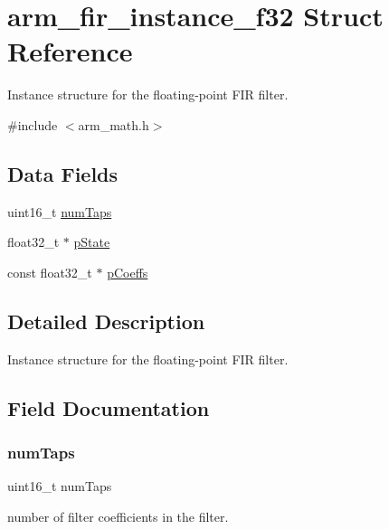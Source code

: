 \hypertarget{structarm__fir__instance__f32}{}\section{arm\+\_\+fir\+\_\+instance\+\_\+f32 Struct Reference}
\label{structarm__fir__instance__f32}


Instance structure for the floating-\/point F\+IR filter.  




{\ttfamily \#include $<$arm\+\_\+math.\+h$>$}

\subsection*{Data Fields}
\begin{DoxyCompactItemize}
\item 
uint16\+\_\+t \mbox{\hyperlink{structarm__fir__instance__f32_a751941891e47f522a7f5375fe8990aac}{num\+Taps}}
\item 
float32\+\_\+t $\ast$ \mbox{\hyperlink{structarm__fir__instance__f32_a335c87e6fdc4b96601d95a5de8b9c463}{p\+State}}
\item 
const float32\+\_\+t $\ast$ \mbox{\hyperlink{structarm__fir__instance__f32_a39230f04a29d8321948e339633780442}{p\+Coeffs}}
\end{DoxyCompactItemize}


\subsection{Detailed Description}
Instance structure for the floating-\/point F\+IR filter. 

\subsection{Field Documentation}
\mbox{\label{structarm__fir__instance__f32_a751941891e47f522a7f5375fe8990aac}} 
\subsubsection{\texorpdfstring{numTaps}{numTaps}}
{\footnotesize\ttfamily uint16\+\_\+t num\+Taps}

number of filter coefficients in the filter. \mbox{\label{structarm__fir__instance__f32_a39230f04a29d8321948e339633780442}} 
